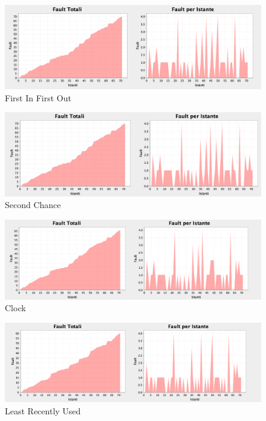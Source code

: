 \documentclass[12px]{article}
\begin{document}
\begin{figure}[!h]
	\centering
	\includegraphics[scale=0.3]{img/fifo}
	\caption{First In First Out}
    \label{fig:FIFO}
\end{figure}

\begin{figure}[!h]
	\centering
	\includegraphics[scale=0.3]{img/sc}
	\caption{Second Chance}
    \label{fig:SC}
\end{figure}

\begin{figure}[!h]
	\centering
	\includegraphics[scale=0.3]{img/c}
	\caption{Clock}
    \label{fig:C}
\end{figure}

\begin{figure}[!h]
	\centering
	\includegraphics[scale=0.3]{img/lru}
	\caption{Least Recently Used}
    \label{fig:LRU}
\end{figure}
\end{document}
